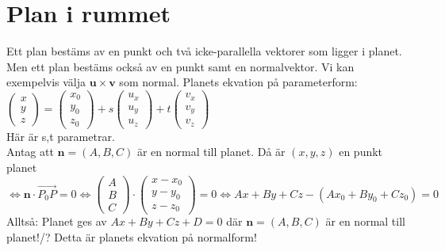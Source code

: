 \chapter{Plan i rummet}
Ett plan bestäms av en punkt och två icke-parallella vektorer som ligger i planet.
Men ett plan bestäms också av en punkt samt en normalvektor.
Vi kan exempelvis välja $\bm{u}\times \bm{v}$ som normal.
Planets ekvation på parameterform: $
\begin{pmatrix}
    x\\y\\z
\end{pmatrix}
=
\begin{pmatrix}
    x_{0}\\y_{0}\\z_{0}
\end{pmatrix}
+s
\begin{pmatrix}
    u_{x}\\u_{y}\\u_{z}
\end{pmatrix}
+t
\begin{pmatrix}
    v_{x}\\v_{y}\\v_{z}
\end{pmatrix}$\\
Här är s,t parametrar.\\
Antag att $\bm{n}=(A,B,C)$ är en normal till planet.
Då är $(x,y,z)$ en punkt planet $\Leftrightarrow \bm{n}\cdot \overrightarrow{P_{0}P}=0\Leftrightarrow \begin{pmatrix}
    A\\B\\C
\end{pmatrix}\cdot \begin{pmatrix}
    x-x_{0}\\y-y_{0}\\z-z_{0}
\end{pmatrix}=0\Leftrightarrow Ax+By+Cz-(Ax_{0}+By_{0}+Cz_{0})=0$\\
Alltså: Planet ges av $Ax+By+Cz+D=0$ där $\bm{n}=(A,B,C)$ är en normal till planet!/?
Detta är planets ekvation på normalform!


